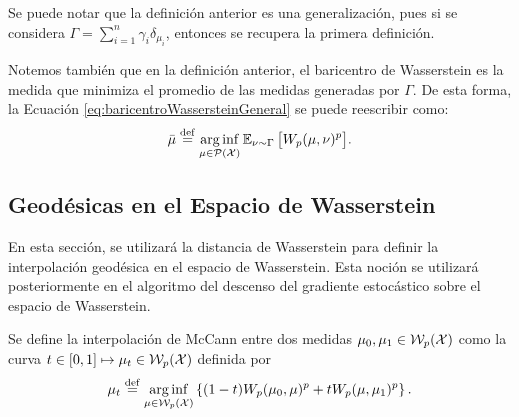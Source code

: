 {{{\begin{definition}
			\end{definition}

			\begin{remark}
				Se puede notar que la definición anterior es una generalización, pues si se considera $\Gamma = \sum_{i=1}^{n} \gamma_i \delta_{\mu_i}$, entonces se recupera la primera definición.
			\end{remark}

			\begin{remark}
				Notemos también que en la definición anterior, el baricentro de Wasserstein es la medida que minimiza el promedio de las medidas generadas por $\Gamma$. De esta forma, la Ecuación \eqref{eq:baricentroWassersteinGeneral} se puede reescribir como:
				\begin{equation}
					\bar \mu \eqdef \arginf_{\mu \in \ProbSpace} \Exp_{\nu \sim \Gamma} \big[ \Wasserstein[p]{\mu}{\nu}^p \big].
				\end{equation}

			\end{remark}




		}  %


		\subsection*{Geodésicas en el Espacio de Wasserstein}\label{ssec:geodesicas-Wasserstein}
		{
			En esta sección, se utilizará la distancia de Wasserstein para definir la interpolación geodésica en el espacio de Wasserstein. Esta noción se utilizará posteriormente en el algoritmo del descenso del gradiente estocástico sobre el espacio de Wasserstein.

			\begin{definition}
				Se define la interpolación de McCann entre dos medidas $\mu_0, \mu_1 \in \WassersteinSpace[p]{\cX} $ como la curva $t \in [0, 1] \mapsto \mu_t \in \WassersteinSpace[p]{\cX} $ definida por
				\begin{equation}
					\mu_t \eqdef \arginf_{\mu \in \WassersteinSpace[p]{\cX} } \left\{ (1-t) \Wasserstein[p]{\mu_0}{\mu}^p + t \Wasserstein[p]{\mu}{\mu_1}^p \right\}.
				\end{equation}
			\end{definition}

}}}
